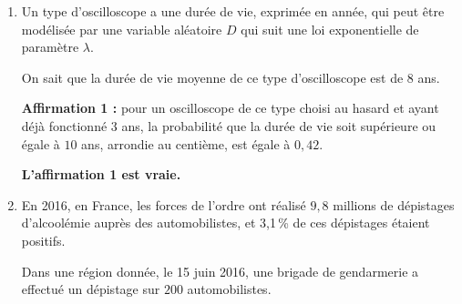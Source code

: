 \documentclass[10pt]{article}
\newcommand{\e}{\mathrm{\,e\,}}%
\begin{document}
\begin{enumerate}
\item Un type d'oscilloscope a une durée de vie, exprimée en année, qui peut être modélisée par une variable aléatoire $D$ qui suit une loi exponentielle de paramètre $\lambda$.

On sait que la durée de vie moyenne de ce type d'oscilloscope est de $8$ ans.

\smallskip

\textbf{Affirmation 1 :} pour un oscilloscope de ce type choisi au hasard et ayant déjà fonctionné $3$ ans, la probabilité que la durée de vie soit supérieure ou égale à $10$ ans, arrondie au centième, est égale à $0,42$.

\textbf{L'affirmation 1 est vraie.}


\medskip

\item  En 2016, en France, les forces de l'ordre ont réalisé $9,8$ millions de dépistages d'alcoolémie auprès des automobilistes, et 3,1\,\% de ces dépistages étaient positifs.
%

Dans une région donnée, le 15 juin 2016, une brigade de gendarmerie a effectué un dépistage
sur $200$ automobilistes.


\end{enumerate}
\end{document}
